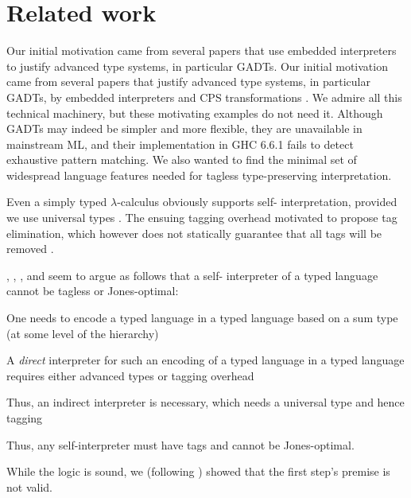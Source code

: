 \section{Related work}\label{related}

\ifshort
Our initial motivation came from several papers 
\citep{WalidICFP02,taha-tag,xi-guarded,peyton-jones-simple}
that use embedded interpreters to justify advanced
type systems, in particular GADTs.
\else
Our initial motivation came from several papers that justify advanced
type systems, in particular GADTs, by embedded interpreters
\citep{WalidICFP02,taha-tag,xi-guarded,peyton-jones-simple} and
CPS transformations \citep{Guillemette-Monier-PLPV,shao-type-toplas,chen-typeful}.
\fi
We admire all this technical machinery, but
these motivating examples do not need it.
Although GADTs may indeed be simpler and more flexible, they are
unavailable in mainstream ML, and their implementation in GHC
6.6.1 fails to
detect exhaustive pattern matching.  We also wanted to find the minimal
set of widespread language features needed for tagless
type-preserving interpretation.

Even a simply typed $\lambda$-calculus obviously supports self\hyp
interpretation, provided we use universal types \citep{taha-tag}.  The
ensuing tagging overhead motivated \citet{Makholm-TagElim,taha-tag} 
to propose tag
elimination, which however does not statically guarantee that all tags
will be removed \citep{WalidICFP02}.

, \citet{taha-tag}, \citet{xi-guarded}, and
\citet{peyton-jones-simple} seem to argue as follows that a self\hyp
interpreter of a typed language cannot be tagless or Jones\hyp optimal:
\begin{shortlist}
\item One needs to encode a typed language in a typed language based on
a sum type (at some level of the hierarchy)\\
\item A \emph{direct} interpreter 
for such an encoding of a typed language
in a typed language requires either
advanced types or tagging overhead\\
\item Thus, an indirect interpreter is necessary, which needs a universal
  type and hence tagging\ifshort\else\\
\item Thus, any self-interpreter must have tags and cannot be 
  Jones-optimal\fi.
\end{shortlist}
While the logic is sound, we (following \citet{yang-encoding}) showed that the
first step's premise is not valid.


